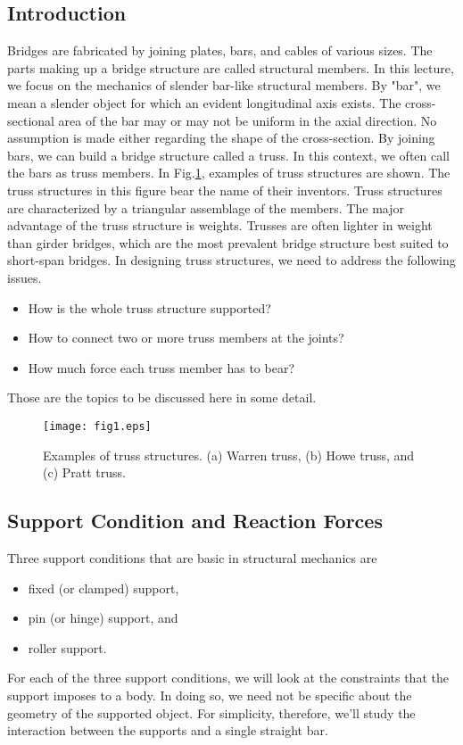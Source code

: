 ﻿\documentclass[10pt,a4j]{article}
\begin{document}
\subsection{Introduction}
Bridges are fabricated by joining plates, bars, and cables of various sizes. The parts making up a bridge structure are called structural members. In this lecture, we focus on the mechanics of slender bar-like structural members. By "bar", we mean a slender object for which an evident longitudinal axis exists. The cross-sectional area of the bar may or may not be uniform in the axial direction. No assumption is made either regarding the shape of the cross-section. By joining bars, we can build a bridge structure called a truss. In this context, we often call the bars as truss members. In Fig.\ref{fig:fig1}, examples of truss structures are shown. The truss structures in this figure bear the name of their inventors. Truss structures are characterized by a triangular assemblage of the members. The major advantage of the truss structure is weights. Trusses are often lighter in weight than girder bridges, which are the most prevalent bridge structure best suited to short-span bridges. In designing truss structures, we need to address the following issues.
\begin{itemize}
\item
	How is the whole truss structure supported?
\item
	How to connect two or more truss members at the joints?
\item
	How much force each truss member has to bear?
\end{itemize}
Those are the topics to be discussed here in some detail. 
\begin{figure}[h]
	\begin{center}
	\texttt{[image: fig1.eps]} 
	\end{center}
	\caption{Examples of truss structures. (a) Warren truss, (b) Howe truss, and (c) Pratt truss.} 
	\label{fig:fig1}
\end{figure}
\subsection{Support Condition and Reaction Forces}
Three support conditions that are basic in structural mechanics are 
\begin{itemize}
\item
	fixed (or clamped) support,
\item
	pin (or hinge) support, and 
\item
	roller support.
\end{itemize}
For each of the three support conditions, we will look at the constraints that the support imposes to a body. In doing so, we need not be specific about the geometry of the supported object. For simplicity, therefore, we'll study the interaction between the supports and a single straight bar. 
\end{document}
